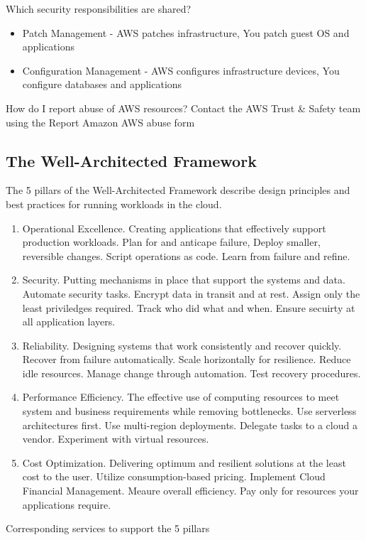 \documentclass{article}%
\begin{document}
Which security responsibilities are shared?
\begin{itemize}
    \item Patch Management - AWS patches infrastructure, You patch guest OS and applications
    \item Configuration Management - AWS configures infrastructure devices, You configure databases and applications
\end{itemize}

How do I report abuse of AWS resources?
Contact the AWS Trust \& Safety team using the Report Amazon AWS abuse form

\subsection{The Well-Architected Framework} 
The 5 pillars of the Well-Architected Framework describe design principles and best practices for running workloads in the cloud.
\begin{enumerate}
    \item Operational Excellence. Creating applications that effectively support production workloads. Plan for and anticape failure, Deploy smaller, reversible changes. Script operations as code. Learn from failure and refine.
    \item Security. Putting mechanisms in place that support the systems and data. Automate security tasks. Encrypt data in transit and at rest. Assign only the least priviledges required. Track who did what and when. Ensure secuirty at all application layers.
    \item Reliability. Designing systems that work consistently and recover quickly. Recover from failure automatically. Scale horizontally for resilience. Reduce idle resources. Manage change through automation. Test recovery procedures. 
    \item Performance Efficiency. The effective use of computing resources to meet system and business requirements while removing bottlenecks. Use serverless architectures first. Use multi-region deployments. Delegate tasks to a cloud a vendor. Experiment with virtual resources.
    \item Cost Optimization. Delivering optimum and resilient solutions at the least cost to the user. Utilize consumption-based pricing. Implement Cloud Financial Management. Meaure overall efficiency. Pay only for resources your applications require. 
\end{enumerate}
Corresponding services to support the 5 pillars
\end{document}
